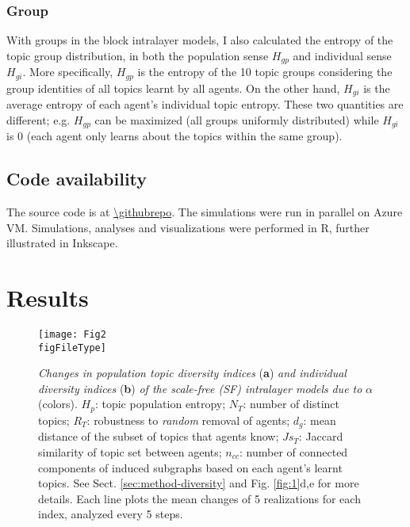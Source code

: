 \documentclass{svproc}
\def\figFileType{.eps}
\begin{document}
\vspace{-1em}
\subsubsection*{Group}

With groups in the block intralayer models, I also calculated the entropy of the topic group distribution, in both the population sense $H_{gp}$ and individual sense $H_{gi}$.
More specifically, $H_{gp}$ is the entropy of the 10 topic groups considering the group identities of all topics learnt by all agents.
On the other hand, $H_{gi}$ is the average entropy of each agent's individual topic entropy.
These two quantities are different; e.g.
    $H_{gp}$ can be maximized (all groups uniformly distributed)
    while $H_{gi}$ is 0 (each agent only learns about the topics within the same group).


\subsection{Code availability}

The source code is at \url{\githubrepo}.
The simulations were run in parallel on Azure VM. Simulations, analyses and visualizations were performed in R, further illustrated in Inkscape.

\section{Results}

\begin{figure}[!ht]
    \centering
    \texttt{[image: Fig2\\figFileType]}
    \caption{
    \textit{Changes in population topic diversity indices} (\textbf{a}) \textit{and individual diversity indices} (\textbf{b}) \textit{of the scale-free (SF) intralayer models} \textit{due to} $\alpha$ (colors).
    $H_p$: topic population entropy;
    $N_T$: number of distinct topics;
    $R_T$: robustness to \textit{random} removal of agents;
    $d_g$: mean distance of the subset of topics that agents know;
    $Js_T$: Jaccard similarity of topic set between agents;
    $n_{cc}$: number of connected components of induced subgraphs based on each agent's learnt topics.
    See Sect. \ref{sec:method-diversity} and Fig. \ref{fig:1}d,e for more details.
    Each line plots the mean changes of 5 realizations for each index, analyzed every 5 steps.
    }
    \label{fig:2}
\end{figure}
\end{document}
